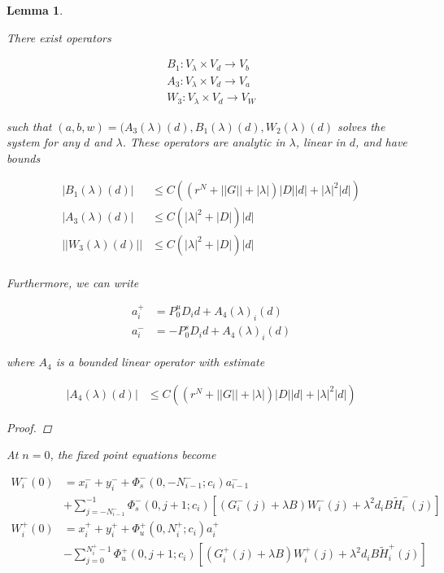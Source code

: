 \documentclass[12pt]{article}
\newtheorem{lemma}{Lemma}
\begin{document}
\begin{lemma}\label{inv3}

There exist operators 

\begin{align*}
B_1 : V_\lambda \times V_d \rightarrow V_b \\
A_3 : V_\lambda \times V_d \rightarrow V_a \\
W_3 : V_\lambda \times V_d \rightarrow V_W
\end{align*}

such that $(a, b, w) = (A_3(\lambda)(d), B_1(\lambda)(d), W_2(\lambda)(d)$ solves the system for any $d$ and $\lambda$. These operators are analytic in $\lambda$, linear in $d$, and have bounds 

\begin{align}
|B_1(\lambda)(d)| &\leq C \left( (r^{N} + ||G|| + |\lambda|)|D| |d| + |\lambda|^2 |d| \right) \label{B1bound} \\
|A_3(\lambda)(d)| &\leq C \left(|\lambda|^2 + |D|\right)|d| \label{A3bound} \\
||W_3(\lambda)(d)|| &\leq C \left(|\lambda|^2 + |D|\right)|d| \label{W3bound} \\
\end{align}

Furthermore, we can write

\begin{align*}
a_i^+ &= P_0^u D_i d + A_4(\lambda)_i(d) \\
a_i^- &= -P_0^s D_i d + A_4(\lambda)_i(d)
\end{align*}

where $A_4$ is a bounded linear operator with estimate

\begin{align}\label{A4bound}
|A_4(\lambda)(d)| &\leq 
C\left( (r^N + ||G|| + |\lambda|)|D||d| + |\lambda|^2 |d|  \right)
\end{align}

\begin{proof}

\end{proof}
At $n = 0$, the fixed point equations become 

\begin{align*}
W_i^-(0) &= x_i^- + y_i^- +
\Phi_s^-(0, -N_{i-1}^-; c_i) a_{i-1}^- \\
&+ \sum_{j = -N_{i-1}^-}^{-1} \Phi_s^-(0, j+1; c_i)
[(G_i^-(j) + \lambda B) W_i^-(j) + \lambda^2 d_i B \tilde{H}_i^-(j)] \\
W_i^+(0) &= x_i^+ + y_i^+ + \Phi_u^+(0, N_i^+; c_i) a_i^+ \\
&- \sum_{j = 0}^{N_i^+-1} \Phi_u^+(0, j+1; c_i) 
[(G_i^+(j) + \lambda B) W_i^+(j) + \lambda^2 d_i B \tilde{H}_i^+(j)]
\end{align*}


\end{lemma}
\end{document}
